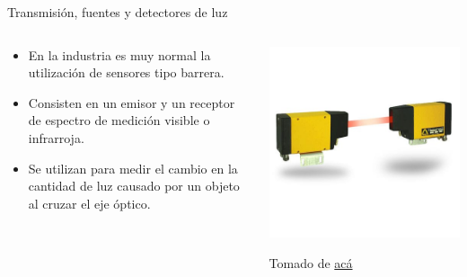 \documentclass[aspectratio=169]{beamer}
\begin{document}
\begin{frame}{Transmisión, fuentes y detectores de luz}
    \begin{columns}[c, onlytextwidth]
        \begin{column}{0.6\textwidth}
            \begin{itemize}
                \item En la industria es muy normal la utilización de sensores tipo barrera.
                \item Consisten en un emisor y un receptor de espectro de medición visible o infrarroja.
                \item Se utilizan para medir el cambio en la cantidad de luz causado por un objeto al cruzar el eje óptico.
            \end{itemize}
        \end{column}
        \begin{column}{0.40\textwidth}
            \includegraphics[width = 1\linewidth]{fig/Optica/barrera.jpg}

            \tiny{Tomado de \href{https://www.directindustry.es/prod/delta/product-68641-561968.html}{acá}}
        \end{column}
    \end{columns}
\end{frame}
\end{document}
